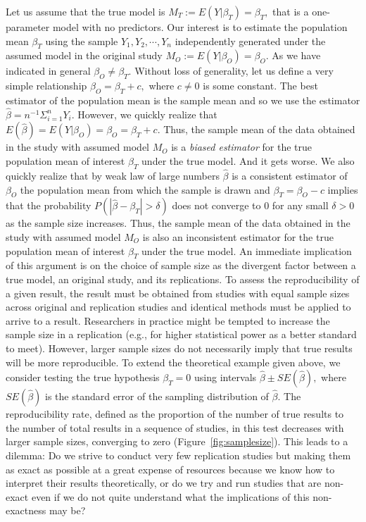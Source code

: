 \documentclass[meta,authordate]{jote-new-article}
\newcounter{result}
\begin{document}
Let us assume that the true model is $M_T:=E(Y|\beta_{T})=\beta_{T},$ that is a one-parameter model with no predictors. Our interest is to estimate the population mean $\beta_{T}$ using the sample $Y_1,Y_2,\cdots, Y_n$ independently generated under the assumed model in the original study $M_O:=E(Y|\beta_{O})=\beta_{O}.$ As we have indicated in general $\beta_{O} \neq \beta_{T}.$ Without loss of generality, let us define a very simple relationship $\beta_{O}=\beta_{T}+c,$ where $c\neq 0$ is some constant. The best estimator of the population mean is the sample mean and so we use the estimator $\hat{\beta}=n^{-1}\Sigma_{i=1}^{n}Y_i.$ However, we quickly realize that $E(\hat{\beta})=E(Y|\beta_{O})=\beta_{O}=\beta_{T}+c.$ Thus, the sample mean of the data obtained in the study with assumed model $M_O$ is a {\em biased estimator} for the true population mean of interest $\beta_{T}$ under the true model. And it gets worse. We also quickly realize that by weak law of large numbers $\hat{\beta}$ is a consistent estimator of $\beta_{O}$ the population mean from which the sample is drawn and  $\beta_{T}=\beta_{O}-c$ implies that the probability $P(|\hat{\beta}-\beta_{T}|>\delta)$ does not converge to $0$ for any small $\delta>0$ as the sample size increases. Thus, the sample mean of the data obtained in the study with assumed model $M_O$ is also an inconsistent estimator for the true population mean of interest $\beta_{T}$ under the true model.
%
An immediate implication of this argument is on the choice of sample size as the divergent factor between a true model, an original study, and its replications. To assess the reproducibility of a given result, the result must be obtained from studies with equal sample sizes across original and replication studies and identical methods must be applied to arrive to a result. Researchers in practice might be tempted to increase the sample size in a replication (e.g., for higher statistical power as a better standard to meet). However, larger sample sizes do not necessarily imply that true results will be more reproducible. To extend the theoretical example given above, we consider testing the true hypothesis $\beta_{T} = 0$ using intervals $\hat{\beta} \pm SE(\hat{\beta}),$ where ${SE}(\hat{\beta})$ is the standard error of the sampling distribution of $\hat{\beta}$. The reproducibility rate, defined as the proportion of the number of true results to the number of total results in a sequence of studies, in this test decreases with larger sample sizes, converging to zero (Figure~\ref{fig:samplesize}). This leads to a dilemma: Do we strive to conduct very few replication studies but making them as exact as possible at a great expense of resources because we know how to interpret their results theoretically, or do we try and run studies that are non-exact even if we do not quite understand what the implications of this non-exactness may be?
\end{document}
